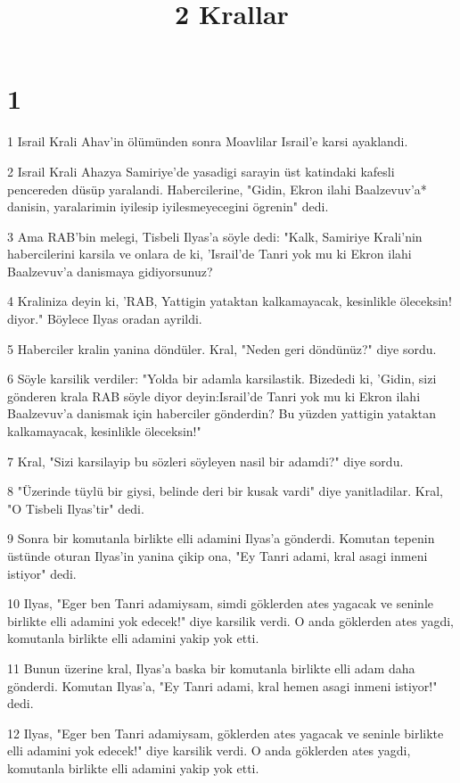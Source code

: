 

\title{2 Krallar}


\chapter{1}

\par 1 Israil Krali Ahav'in ölümünden sonra Moavlilar Israil'e karsi ayaklandi.
\par 2 Israil Krali Ahazya Samiriye'de yasadigi sarayin üst katindaki kafesli pencereden düsüp yaralandi. Habercilerine, "Gidin, Ekron ilahi Baalzevuv'a* danisin, yaralarimin iyilesip iyilesmeyecegini ögrenin" dedi.
\par 3 Ama RAB'bin melegi, Tisbeli Ilyas'a söyle dedi: "Kalk, Samiriye Krali'nin habercilerini karsila ve onlara de ki, 'Israil'de Tanri yok mu ki Ekron ilahi Baalzevuv'a danismaya gidiyorsunuz?
\par 4 Kraliniza deyin ki, 'RAB, Yattigin yataktan kalkamayacak, kesinlikle öleceksin! diyor." Böylece Ilyas oradan ayrildi.
\par 5 Haberciler kralin yanina döndüler. Kral, "Neden geri döndünüz?" diye sordu.
\par 6 Söyle karsilik verdiler: "Yolda bir adamla karsilastik. Bizededi ki, 'Gidin, sizi gönderen krala RAB söyle diyor deyin:Israil'de Tanri yok mu ki Ekron ilahi Baalzevuv'a danismak için haberciler gönderdin? Bu yüzden yattigin yataktan kalkamayacak, kesinlikle öleceksin!"
\par 7 Kral, "Sizi karsilayip bu sözleri söyleyen nasil bir adamdi?" diye sordu.
\par 8 "Üzerinde tüylü bir giysi, belinde deri bir kusak vardi" diye yanitladilar. Kral, "O Tisbeli Ilyas'tir" dedi.
\par 9 Sonra bir komutanla birlikte elli adamini Ilyas'a gönderdi. Komutan tepenin üstünde oturan Ilyas'in yanina çikip ona, "Ey Tanri adami, kral asagi inmeni istiyor" dedi.
\par 10 Ilyas, "Eger ben Tanri adamiysam, simdi göklerden ates yagacak ve seninle birlikte elli adamini yok edecek!" diye karsilik verdi. O anda göklerden ates yagdi, komutanla birlikte elli adamini yakip yok etti.
\par 11 Bunun üzerine kral, Ilyas'a baska bir komutanla birlikte elli adam daha gönderdi. Komutan Ilyas'a, "Ey Tanri adami, kral hemen asagi inmeni istiyor!" dedi.
\par 12 Ilyas, "Eger ben Tanri adamiysam, göklerden ates yagacak ve seninle birlikte elli adamini yok edecek!" diye karsilik verdi. O anda göklerden ates yagdi, komutanla birlikte elli adamini yakip yok etti.
